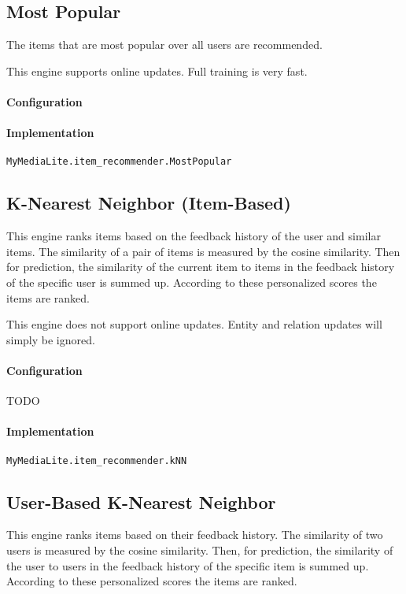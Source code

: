 \documentclass[]{report}
\begin{document}
\subsection[Most Popular]{Most Popular}
The items that are most popular over all users are recommended.

This engine supports online updates. Full training is very fast.

\paragraph[Configuration]{Configuration}

\paragraph[Implementation]{Implementation}
\texttt{MyMediaLite.item\_recommender.MostPopular}

\subsection[K{}-Nearest Neighbor (Item{}-Based)]{K-Nearest Neighbor
(Item-Based)}
This engine ranks items based on the feedback history of the user and
similar items. The similarity of a pair of items is measured by the
cosine similarity. Then for prediction, the similarity of the current
item to items in the feedback history of the specific user is summed
up. According to these personalized scores the items are ranked.

This engine does not support online updates. Entity and relation updates
will simply be ignored.

\paragraph[Configuration]{Configuration}
TODO

\paragraph[Implementation]{Implementation}
\texttt{MyMediaLite.item\_recommender.kNN}

\subsection[User{}-Based K{}-Nearest Neighbor]{User-Based K-Nearest
Neighbor}
This engine ranks items based on their feedback history. The
similarity of two users is measured by the cosine similarity. Then, for
prediction, the similarity of the user to users in the feedback history
of the specific item is summed up. According to these personalized
scores the items are ranked.
\end{document}

